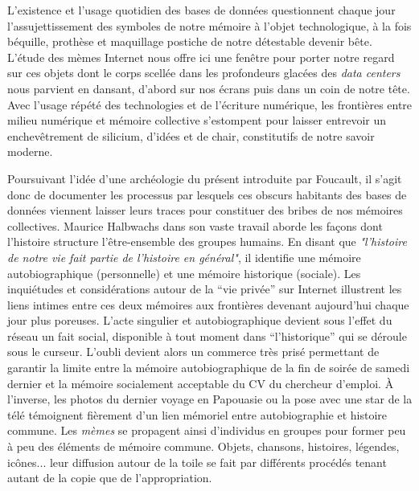 L{\textquoteright}existence et l{\textquoteright}usage quotidien des bases de donn\'ees questionnent chaque jour l{\textquoteright}assujettissement des symboles de notre m\'emoire \`a l{\textquoteright}objet technologique, \`a la fois b\'equille, proth\`ese et maquillage postiche de notre d\'etestable devenir b\^ete. L{\textquoteright}\'etude des m\`emes Internet nous offre ici une fen\^etre pour porter notre regard sur ces objets dont le corps scell\'ee dans les profondeurs glac\'ees des \textit{data centers }nous parvient en dansant, d{\textquoteright}abord sur nos \'ecrans puis dans un coin de notre t\^ete. Avec l{\textquoteright}usage r\'ep\'et\'e des technologies et de l{\textquoteright}\'ecriture num\'erique, les fronti\`eres entre milieu num\'erique et m\'emoire collective s{\textquoteright}estompent pour laisser entrevoir un enchev\^etrement de silicium, d{\textquoteright}id\'ees et de chair, constitutifs de notre savoir moderne. 

Poursuivant l{\textquoteright}id\'ee d{\textquoteright}une arch\'eologie du pr\'esent introduite par Foucault, il s{\textquoteright}agit donc de documenter les processus par lesquels ces obscurs habitants des bases de donn\'ees viennent laisser leurs traces pour constituer des bribes de nos m\'emoires collectives. Maurice Halbwachs dans son vaste travail aborde les fa\c{c}ons dont l{\textquoteright}histoire structure l{\textquoteright}\^etre-ensemble des groupes humains. En disant que \textit{"l'histoire de notre vie fait partie de l'histoire en général"}\citep{Halbwachs1947}, il identifie une m\'emoire autobiographique (personnelle) et une m\'emoire historique (sociale). Les inqui\'etudes et consid\'erations autour de la {\textquotedblleft}vie priv\'ee{\textquotedblright} sur Internet illustrent les liens intimes entre ces deux m\'emoires aux fronti\`eres devenant aujourd{\textquoteright}hui chaque jour plus poreuses. L{\textquoteright}acte singulier et autobiographique devient sous l{\textquoteright}effet du r\'eseau un fait social, disponible \`a tout moment dans {\textquotedblleft}l{\textquoteright}historique{\textquotedblright} qui se d\'eroule sous le curseur. L{\textquoteright}oubli devient alors un commerce tr\`es pris\'e permettant de garantir la limite entre la m\'emoire autobiographique de la fin de soir\'ee de samedi dernier et la m\'emoire socialement acceptable du CV du chercheur d{\textquoteright}emploi. \`A l{\textquoteright}inverse, les photos du dernier voyage en Papouasie ou la pose avec une star de la t\'el\'e t\'emoignent fi\`erement d{\textquoteright}un lien m\'emoriel entre autobiographie et histoire commune. Les \textit{m\`emes} se propagent ainsi d{\textquoteright}individus en groupes pour former peu \`a peu des \'el\'ements de m\'emoire commune. Objets, chansons, histoires, l\'egendes, ic\^ones... leur diffusion autour de la toile se fait par diff\'erents proc\'ed\'es tenant autant de la copie que de l{\textquoteright}appropriation. 


